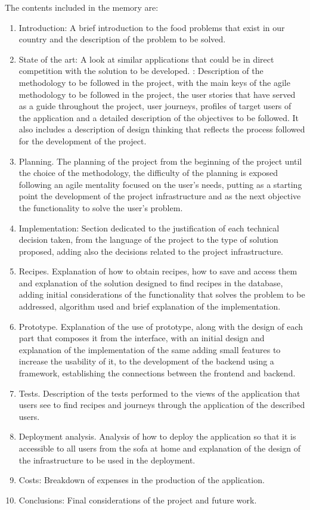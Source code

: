 The contents included in the memory are:
\begin{enumerate}
    \item Introduction: A brief introduction to the food problems that exist in our country and the description of the problem to be solved.
    \item State of the art: A look at similar applications that could be in direct competition with the solution to be developed.
    \Methodology: Description of the methodology to be followed in the project, with the main keys of the agile methodology to be followed in the project, the user stories that have served as a guide throughout the project, user journeys, profiles of target users of the application and a detailed description of the objectives to be followed. It also includes a description of design thinking that reflects the process followed for the development of the project.
    \item Planning. The planning of the project from the beginning of the project until the choice of the methodology, the difficulty of the planning is exposed following an agile mentality focused on the user's needs, putting as a starting point the development of the project infrastructure and as the next objective the functionality to solve the user's problem.
    \item Implementation: Section dedicated to the justification of each technical decision taken, from the language of the project to the type of solution proposed, adding also the decisions related to the project infrastructure.
    \item Recipes. Explanation of how to obtain recipes, how to save and access them and explanation of the solution designed to find recipes in the database, adding initial considerations of the functionality that solves the problem to be addressed, algorithm used and brief explanation of the implementation.
    \item Prototype. Explanation of the use of prototype, along with the design of each part that composes it from the interface, with an initial design and explanation of the implementation of the same adding small features to increase the usability of it, to the development of the backend using a framework, establishing the connections between the frontend and backend.
    \item Tests. Description of the tests performed to the views of the application that users see to find recipes and journeys through the application of the described users.
    \item Deployment analysis. Analysis of how to deploy the application so that it is accessible to all users from the sofa at home and explanation of the design of the infrastructure to be used in the deployment.
    \item Costs: Breakdown of expenses in the production of the application.
    \item Conclusions: Final considerations of the project and future work.
\end{enumerate}

